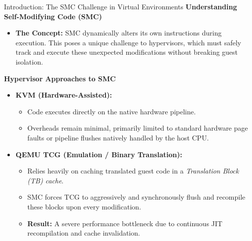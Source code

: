 \documentclass[aspectratio=169]{beamer} %
\begin{document}
  \begin{frame}{Introduction: The SMC Challenge in Virtual Environments}
      \textbf{Understanding Self-Modifying Code (SMC)}
      \begin{itemize}
          \item \textbf{The Concept:} SMC dynamically alters its own instructions during execution. This poses a unique challenge to hypervisors, which must safely track and execute these unexpected modifications without breaking guest isolation.
      \end{itemize}
      
      \vspace{0.4cm}
      \textbf{Hypervisor Approaches to SMC}
      \begin{itemize}
          \item \textbf{KVM (Hardware-Assisted):}
          \begin{itemize}
              \item Code executes directly on the native hardware pipeline.
              \item Overheads remain minimal, primarily limited to standard hardware page faults or pipeline flushes natively handled by the host CPU.
          \end{itemize}
          
          \vspace{0.2cm}
          \item \textbf{QEMU TCG (Emulation / Binary Translation):}
          \begin{itemize}
              \item Relies heavily on caching translated guest code in a \textit{Translation Block (TB) cache}.
              \item SMC forces TCG to aggressively and synchronously flush and recompile these blocks upon every modification.
              \item \textbf{Result:} A severe performance bottleneck due to continuous JIT recompilation and cache invalidation.
          \end{itemize}
      \end{itemize}
  \end{frame}
\end{document}
